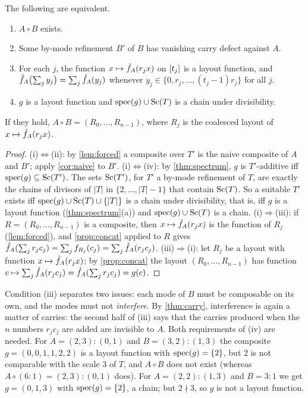 \begin{theorem}\label{thm:exact}
The following are equivalent.
\begin{enumerate}[label=(\roman*),itemsep=1pt]
\item $A\circ B$ exists.
\item Some by-mode refinement $B'$ of $B$ has vanishing carry defect against $A$.
\item For each $j$, the function $x\mapsto\hat{f}_{A}(r_jx)$ on $[t_j]$ is a layout function, and
 $\hat{f}_{A}\bigl(\sum_jy_j\bigr)=\sum_j\hat{f}_{A}(y_j)$ whenever $y_j\in\{0,r_j,\dots,(t_j-1)r_j\}$ for all $j$.
\item $g$ is a layout function and $\operatorname{spec}(g)\cup\operatorname{Sc}(T)$ is a chain under divisibility.
\end{enumerate}
If they hold, $A\circ B=(R_0,\dots,R_{n-1})$, where $R_j$ is the coalesced layout of
$x\mapsto\hat{f}_{A}(r_jx)$.
\end{theorem}
\begin{proof}
(i)$\Leftrightarrow$(ii): by \cref{lem:forced} a composite over $T'$ is the naive composite of $A$
and $B'$; apply \cref{cor:naive} to $B'$.
(i)$\Leftrightarrow$(iv): by \cref{thm:spectrum}, $g$ is $T'$-additive iff
$\operatorname{spec}(g)\subseteq\operatorname{Sc}(T')$. The sets $\operatorname{Sc}(T')$, for $T'$ a by-mode refinement of $T$, are exactly
the chains of divisors of $|T|$ in $\{2,\dots,|T|-1\}$ that contain $\operatorname{Sc}(T)$. So a suitable $T'$
exists iff $\operatorname{spec}(g)\cup\operatorname{Sc}(T)\cup\{|T|\}$ is a chain under divisibility, that is, iff $g$ is a
layout function (\cref{thm:spectrum}(a)) and $\operatorname{spec}(g)\cup\operatorname{Sc}(T)$ is a chain.
(i)$\Rightarrow$(iii): if $R=(R_0,\dots,R_{n-1})$ is a composite, then $x\mapsto\hat{f}_{A}(r_jx)$ is
the function of $R_j$ (\cref{lem:forced}), and \cref{prop:concat} applied to $R$ gives
$\hat{f}_{A}(\sum_jr_jc_j)=\sum_jf_{R_j}(c_j)=\sum_j\hat{f}_{A}(r_jc_j)$.
(iii)$\Rightarrow$(i): let $R_j$ be a layout with function $x\mapsto\hat{f}_{A}(r_jx)$; by
\cref{prop:concat} the layout $(R_0,\dots,R_{n-1})$ has function
$c\mapsto\sum_j\hat{f}_{A}(r_jc_j)=\hat{f}_{A}(\sum_jr_jc_j)=g(c)$.
\end{proof}

Condition (iii) separates two issues: each mode of $B$ must be composable on its own, and the
modes must not \emph{interfere}. By \cref{thm:carry}, interference is again a matter of carries:
the second half of (iii) says that the carries produced when the $n$ numbers $r_jc_j$ are added
are invisible to $A$. Both requirements of (iv) are needed. For $A=(2,3):(0,1)$ and
$B=(3,2):(1,3)$ the composite $g=(0,0,1,1,2,2)$ is a layout function with $\operatorname{spec}(g)=\{2\}$, but
$2$ is not comparable with the scale $3$ of $T$, and $A\circ B$ does not exist (whereas
$A\circ(6:1)=(2,3):(0,1)$ does). For $A=(2,2):(1,3)$ and $B=3:1$ we get $g=(0,1,3)$ with
$\operatorname{spec}(g)=\{2\}$, a chain; but $2\nmid3$, so $g$ is not a layout function.

